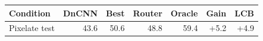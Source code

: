 \begin{tabular}{lrrrrrr}
\toprule
Condition & DnCNN & Best & Router & Oracle & Gain & LCB \\
\midrule
Pixelate test & 43.6 & 50.6 & 48.8 & 59.4 & +5.2 & +4.9 \\
\bottomrule
\end{tabular}
